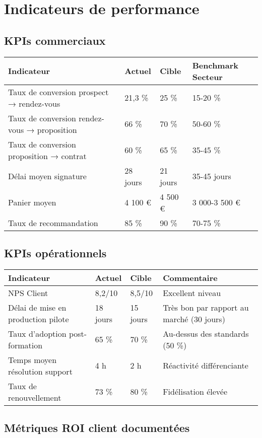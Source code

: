 \section{Indicateurs de performance}

\subsection{KPIs commerciaux}

\begin{longtable}{@{}p{5cm}p{3cm}p{3cm}p{3cm}@{}}
\toprule
\textbf{Indicateur} & \textbf{Actuel} & \textbf{Cible} & \textbf{Benchmark Secteur} \\
\midrule
Taux de conversion prospect → rendez-vous & 21,3 \% & 25 \% & 15-20 \% \\
Taux de conversion rendez-vous → proposition & 66 \% & 70 \% & 50-60 \% \\
Taux de conversion proposition → contrat & 60 \% & 65 \% & 35-45 \% \\
Délai moyen signature & 28 jours & 21 jours & 35-45 jours \\
Panier moyen & 4 100 € & 4 500 € & 3 000-3 500 € \\
Taux de recommandation & 85 \% & 90 \% & 70-75 \% \\
\bottomrule
\end{longtable}

\subsection{KPIs opérationnels}

\begin{longtable}{@{}p{5cm}p{3cm}p{3cm}p{3cm}@{}}
\toprule
\textbf{Indicateur} & \textbf{Actuel} & \textbf{Cible} & \textbf{Commentaire} \\
\midrule
NPS Client & 8,2/10 & 8,5/10 & Excellent niveau \\
Délai de mise en production pilote & 18 jours & 15 jours & Très bon par rapport au marché (30 jours) \\
Taux d’adoption post-formation & 65 \% & 70 \% & Au-dessus des standards (50 \%) \\
Temps moyen résolution support & 4 h & 2 h & Réactivité différenciante \\
Taux de renouvellement & 73 \% & 80 \% & Fidélisation élevée \\
\bottomrule
\end{longtable}

\subsection{Métriques ROI client documentées}

